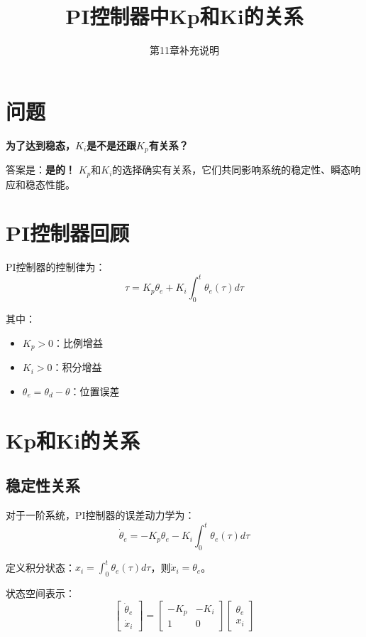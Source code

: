 \documentclass[12pt,a4paper]{article}
\title{PI控制器中Kp和Ki的关系}
\author{第11章补充说明}
\date{}
\begin{document}
\maketitle

\section{问题}

\textbf{为了达到稳态，$K_i$是不是还跟$K_p$有关系？}

答案是：\textbf{是的！} $K_p$和$K_i$的选择确实有关系，它们共同影响系统的稳定性、瞬态响应和稳态性能。

\section{PI控制器回顾}

PI控制器的控制律为：
\begin{equation}
\tau = K_p \theta_e + K_i \int_0^t \theta_e(\tau) d\tau
\end{equation}

其中：
\begin{itemize}
\item $K_p > 0$：比例增益
\item $K_i > 0$：积分增益
\item $\theta_e = \theta_d - \theta$：位置误差
\end{itemize}

\section{Kp和Ki的关系}

\subsection{稳定性关系}

对于一阶系统，PI控制器的误差动力学为：
\begin{equation}
\dot{\theta}_e = -K_p \theta_e - K_i \int_0^t \theta_e(\tau) d\tau
\end{equation}

定义积分状态：$x_i = \int_0^t \theta_e(\tau) d\tau$，则$\dot{x}_i = \theta_e$。

状态空间表示：
\begin{equation}
\begin{bmatrix} \dot{\theta}_e \\ \dot{x}_i \end{bmatrix} = \begin{bmatrix} -K_p & -K_i \\ 1 & 0 \end{bmatrix} \begin{bmatrix} \theta_e \\ x_i \end{bmatrix}
\end{equation}
\end{document}
